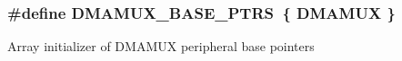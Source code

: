 \subsubsection[{\texorpdfstring{D\+M\+A\+M\+U\+X\+\_\+\+B\+A\+S\+E\+\_\+\+P\+T\+RS}{DMAMUX_BASE_PTRS}}]{\setlength{\rightskip}{0pt plus 5cm}\#define D\+M\+A\+M\+U\+X\+\_\+\+B\+A\+S\+E\+\_\+\+P\+T\+RS~\{ {\bf D\+M\+A\+M\+UX} \}}\hypertarget{group__DMAMUX__Peripheral__Access__Layer_gaad218c12978071501dc2899f0624de4b}{}\label{group__DMAMUX__Peripheral__Access__Layer_gaad218c12978071501dc2899f0624de4b}
Array initializer of D\+M\+A\+M\+UX peripheral base pointers 